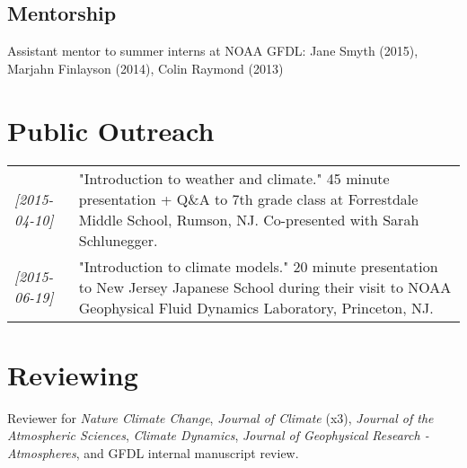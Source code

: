 \documentclass[12pt,letterpaper]{shillcv}
\begin{document}
\subsection*{Mentorship}
\label{sec:org4104e51}
Assistant mentor to summer interns at NOAA GFDL: Jane Smyth (2015), Marjahn
Finlayson (2014), Colin Raymond (2013)
\section*{Public Outreach}
\label{sec:orgf8a1ce6}
\begin{center}
\begin{tabularx}{\textwidth}{lX}
\textit{[2015-04-10]} & "Introduction to weather and climate."  45 minute presentation + Q\&A to 7th grade class at Forrestdale Middle School, Rumson, NJ.  Co-presented with Sarah Schlunegger.\\
\textit{[2015-06-19]} & "Introduction to climate models."  20 minute presentation to New Jersey Japanese School during their visit to NOAA Geophysical Fluid Dynamics Laboratory, Princeton, NJ.\\
\end{tabularx}
\end{center}
\section*{Reviewing}
\label{sec:org2e39ff1}
Reviewer for \emph{Nature Climate Change}, \emph{Journal of Climate} (x3), \emph{Journal of the
Atmospheric Sciences}, \emph{Climate Dynamics}, \emph{Journal of Geophysical Research -
Atmospheres}, and GFDL internal manuscript review.
\end{document}

